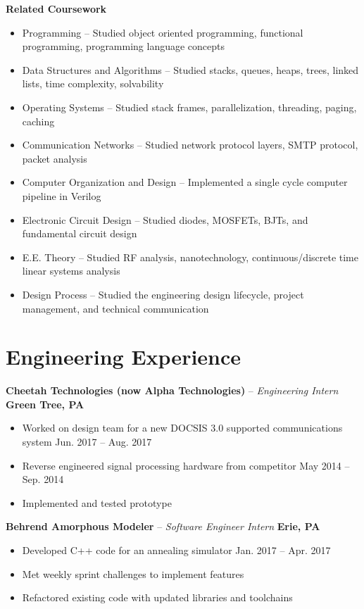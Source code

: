 \documentclass[letterpaper,10pt]{article}
\begin{document}
\textbf{Related Coursework}
\begin{itemize}
\item Programming -- Studied object oriented programming, functional programming, programming language concepts
\item Data Structures and Algorithms -- Studied stacks, queues, heaps, trees, linked lists, time complexity, solvability
\item Operating Systems -- Studied stack frames, parallelization, threading, paging, caching
\item Communication Networks -- Studied network protocol layers, SMTP protocol, packet analysis
\item Computer Organization and Design -- Implemented a single cycle computer pipeline in Verilog
\item Electronic Circuit Design -- Studied diodes, MOSFETs, BJTs, and fundamental circuit design
\item E.E. Theory -- Studied RF analysis, nanotechnology, continuous/discrete time linear systems analysis
\item Design Process -- Studied the engineering design lifecycle, project management, and technical communication
\end{itemize}

\section{Engineering Experience}
\textbf{Cheetah Technologies (now Alpha Technologies)} -- \textit{Engineering Intern} \hfill \textbf{Green Tree, PA}
\begin{itemize}
\item Worked on design team for a new DOCSIS 3.0 supported communications system \hfill Jun. 2017 -- Aug. 2017
\item Reverse engineered signal processing hardware from competitor \hfill May 2014 -- Sep. 2014
\item Implemented and tested prototype
\end{itemize}
\textbf{Behrend Amorphous Modeler} -- \textit{Software Engineer Intern} \hfill \textbf{Erie, PA}
\begin{itemize}
\item Developed C++ code for an annealing simulator \hfill Jan. 2017 -- Apr. 2017
\item Met weekly sprint challenges to implement features
\item Refactored existing code with updated libraries and toolchains
\end{itemize}
\end{document}
